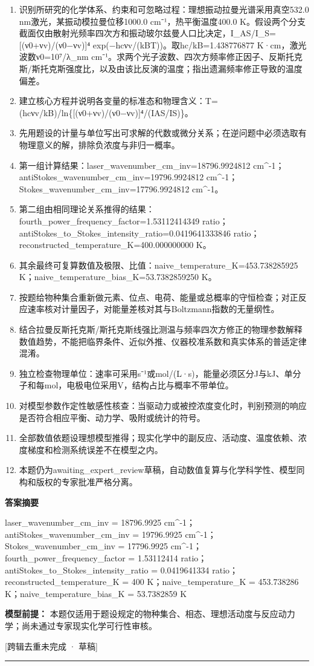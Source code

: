 \documentclass[UTF8,11pt,a4paper]{ctexart}
\begin{document}
\begin{enumerate}
\item 识别所研究的化学体系、约束和可忽略过程：理想振动拉曼光谱采用真空532.0 nm激光，某振动模拉曼位移1000.0 cm⁻¹，热平衡温度400.0 K。假设两个分支截面仅由散射光频率四次方和振动玻尔兹曼人口比决定，I\_AS/I\_S=[(ν0+νv)/(ν0−νv)]⁴ exp(−hcνv/(kBT))。取hc/kB=1.438776877 K·cm，激光波数ν0=10⁷/λ\_nm cm⁻¹。求两个光子波数、四次方频率修正因子、反斯托克斯/斯托克斯强度比，以及由该比反演的温度；指出遗漏频率修正导致的温度偏差。
\item 建立核心方程并说明各变量的标准态和物理含义：T=(hcνv/kB)/ln\{[(ν0+νv)/(ν0−νv)]⁴/(IAS/IS)\}。
\item 先用题设的计量与单位写出可求解的代数或微分关系；在逆问题中必须选取有物理意义的解，排除负浓度与非归一概率。
\item 第一组计算结果：laser\_wavenumber\_cm\_inv=18796.9924812 cm\textasciicircum{}-1；antiStokes\_wavenumber\_cm\_inv=19796.9924812 cm\textasciicircum{}-1；Stokes\_wavenumber\_cm\_inv=17796.9924812 cm\textasciicircum{}-1。
\item 第二组由相同理论关系推得的结果：fourth\_power\_frequency\_factor=1.53112414349 ratio；antiStokes\_to\_Stokes\_intensity\_ratio=0.0419641333846 ratio；reconstructed\_temperature\_K=400.000000000 K。
\item 其余最终可复算数值及极限、比值：naive\_temperature\_K=453.738285925 K；naive\_temperature\_bias\_K=53.7382859250 K。
\item 按题给物种集合重新做元素、位点、电荷、能量或总概率的守恒检查；对正反应速率核对计量因子，对能量差核对其与Boltzmann指数的无量纲性。
\item 结合拉曼反斯托克斯/斯托克斯线强比测温与频率四次方修正的物理参数解释数值趋势，不能把临界条件、近似外推、仪器校准系数和真实体系的普适定律混淆。
\item 独立检查物理单位：速率可采用s⁻¹或mol/(L·s)，能量必须区分J与kJ、单分子和每mol，电极电位采用V，结构占比与概率不带单位。
\item 对模型参数作定性敏感性核查：当驱动力或被控浓度变化时，判别预测的响应是否符合相应平衡、动力学、吸附或统计的符号。
\item 全部数值依题设理想模型推得；现实化学中的副反应、活动度、温度依赖、浓度梯度和检测系统误差不在模型之内。
\item 本题仍为awaiting\_expert\_review草稿，自动数值复算与化学科学性、模型同构和版权的专家批准严格分离。
\end{enumerate}
\noindent\textbf{答案摘要}\par
laser\_wavenumber\_cm\_inv = 18796.9925 cm\textasciicircum{}-1；antiStokes\_wavenumber\_cm\_inv = 19796.9925 cm\textasciicircum{}-1；Stokes\_wavenumber\_cm\_inv = 17796.9925 cm\textasciicircum{}-1；fourth\_power\_frequency\_factor = 1.53112414 ratio；antiStokes\_to\_Stokes\_intensity\_ratio = 0.0419641334 ratio；reconstructed\_temperature\_K = 400 K；naive\_temperature\_K = 453.738286 K；naive\_temperature\_bias\_K = 53.7382859 K\par
\noindent\textbf{模型前提：}
本题仅适用于题设规定的物种集合、相态、理想活动度与反应动力学；尚未通过专家现实化学可行性审核。\par
\noindent\textcolor{red!65!black}{[跨辑去重未完成 · 草稿]} \par
\medskip\hrule\medskip
{}
\end{document}
